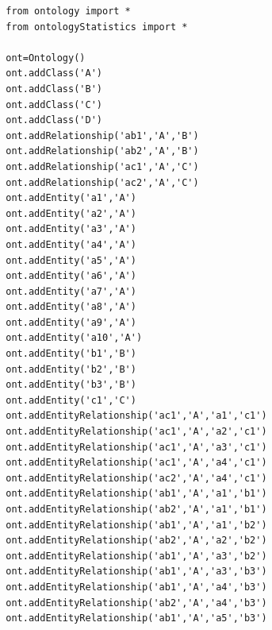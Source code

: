 \documentclass{article}
\begin{document}
	\normalsize
	\begin{verbatim}
		from ontology import *
		from ontologyStatistics import *
		
		ont=Ontology()
		ont.addClass('A')
		ont.addClass('B')
		ont.addClass('C')
		ont.addClass('D')
		ont.addRelationship('ab1','A','B')
		ont.addRelationship('ab2','A','B')
		ont.addRelationship('ac1','A','C')
		ont.addRelationship('ac2','A','C')
		ont.addEntity('a1','A')
		ont.addEntity('a2','A')
		ont.addEntity('a3','A')
		ont.addEntity('a4','A')
		ont.addEntity('a5','A')
		ont.addEntity('a6','A')
		ont.addEntity('a7','A')
		ont.addEntity('a8','A')
		ont.addEntity('a9','A')
		ont.addEntity('a10','A')
		ont.addEntity('b1','B')
		ont.addEntity('b2','B')
		ont.addEntity('b3','B')
		ont.addEntity('c1','C')
		ont.addEntityRelationship('ac1','A','a1','c1')
		ont.addEntityRelationship('ac1','A','a2','c1')
		ont.addEntityRelationship('ac1','A','a3','c1')
		ont.addEntityRelationship('ac1','A','a4','c1')
		ont.addEntityRelationship('ac2','A','a4','c1')
		ont.addEntityRelationship('ab1','A','a1','b1')
		ont.addEntityRelationship('ab2','A','a1','b1')
		ont.addEntityRelationship('ab1','A','a1','b2')
		ont.addEntityRelationship('ab2','A','a2','b2')
		ont.addEntityRelationship('ab1','A','a3','b2')
		ont.addEntityRelationship('ab1','A','a3','b3')
		ont.addEntityRelationship('ab1','A','a4','b3')
		ont.addEntityRelationship('ab2','A','a4','b3')
		ont.addEntityRelationship('ab1','A','a5','b3')
		

\end{verbatim}
\end{document}

